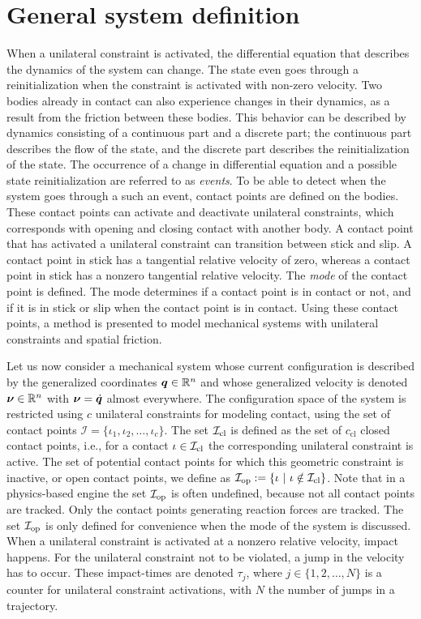 \documentclass[../DC2019003Bouma.tex]{subfiles}
\begin{document}
\section{General system definition}
When a unilateral constraint is activated, the differential equation that describes the dynamics of the system can change. The state even goes through a reinitialization when the constraint is activated with non-zero velocity. Two bodies already in contact can also experience changes in their dynamics, as a result from the friction between these bodies. This behavior can be described by dynamics consisting of a continuous part and a discrete part; the continuous part describes the flow of the state, and the discrete part describes the reinitialization of the state. The occurrence of a change in differential equation and a possible state reinitialization are referred to as \textit{events}. To be able to detect when the system goes through a such an event, contact points are defined on the bodies. These contact points can activate and deactivate unilateral constraints, which corresponds with opening and closing contact with another body. A contact point that has activated a unilateral constraint can transition between stick and slip. A contact point in stick has a tangential relative velocity of zero, whereas a contact point in stick has a nonzero tangential relative velocity. The \textit{mode} of the contact point is defined. The mode determines if a contact point is in contact or not, and if it is in stick or slip when the contact point is in contact. Using these contact points, a method is presented to model mechanical systems with unilateral constraints and spatial friction. 

Let us now consider a mechanical system whose current configuration is described by the generalized coordinates ${\boldsymbol{q}}\in\mathbb{R}^n$ and whose generalized velocity is denoted $\boldsymbol{\nu}\in\mathbb{R}^n$ with $\boldsymbol{\nu}=\dot{{\boldsymbol{q}}}$ almost everywhere. The configuration space of the system is restricted using $c$ unilateral constraints for modeling contact, using the set of contact points $\mathcal{I}=\{\iota_1,\iota_2,\dots,\iota_c\}$. The set $\mathcal{I}_{\text{cl}}$ is defined as the set of $c_{\text{cl}}$ closed contact points, i.e., for a contact $\iota\in\mathcal{I}_{\text{cl}}$ the corresponding unilateral constraint is active. The set of potential contact points for which this geometric constraint is inactive, or open contact points, we define as $\Ic_{\text{op}} := \{\iota\ |\ \iota\notin\Ic_{\text{cl}}\}$. Note that in a physics-based engine the set $\mathcal{I}_{\text{op}}$ is often undefined, because not all contact points are tracked. Only the contact points generating reaction forces are tracked. The set $\mathcal{I}_{\text{op}}$ is only defined for convenience when the mode of the system is discussed. When a unilateral constraint is activated at a nonzero relative velocity, impact happens. For the unilateral constraint not to be violated, a jump in the velocity has to occur. These impact-times are denoted $\tau_j$, where $j\in \{1,2,\dots,N\}$ is a counter for unilateral constraint activations, with $N$ the number of jumps in a trajectory.
\end{document}
